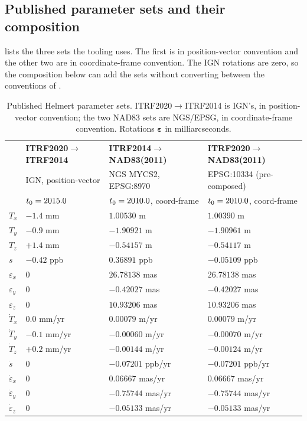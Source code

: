 \documentclass[main.tex]{subfiles}
\begin{document}
\subsection{Published parameter sets and their composition}\label{sec:trf-params}

 lists the three sets the tooling uses.  The first
is in position-vector convention and the other two are in
coordinate-frame convention.  The IGN rotations are zero, so the
composition below can add the sets without converting between the
conventions of .

\begin{table}[htbp]
\centering
\small
\caption{Published Helmert parameter sets.  ITRF2020$\to$ITRF2014 is
IGN's, in position-vector convention; the two NAD83 sets are NGS/EPSG,
in coordinate-frame convention.  Rotations $\bm{\varepsilon}$ in
milliarcseconds.}
\label{tab:trf-params}
\begin{tabular}{llll}
\toprule
& \textbf{ITRF2020$\to$ITRF2014} & \textbf{ITRF2014$\to$NAD83(2011)} & \textbf{ITRF2020$\to$NAD83(2011)} \\
& IGN, position-vector & NGS MYCS2, EPSG:8970 & EPSG:10334 (pre-composed) \\
& $t_0=2015.0$ & $t_0=2010.0$, coord-frame & $t_0=2010.0$, coord-frame \\
\midrule
$T_x$ & $-1.4$ mm            & $1.00530$ m      & $1.00390$ m \\
$T_y$ & $-0.9$ mm            & $-1.90921$ m     & $-1.90961$ m \\
$T_z$ & $+1.4$ mm            & $-0.54157$ m     & $-0.54117$ m \\
$s$   & $-0.42$ ppb          & $0.36891$ ppb    & $-0.05109$ ppb \\
$\varepsilon_x$ & $0$        & $26.78138$ mas   & $26.78138$ mas \\
$\varepsilon_y$ & $0$        & $-0.42027$ mas   & $-0.42027$ mas \\
$\varepsilon_z$ & $0$        & $10.93206$ mas   & $10.93206$ mas \\
\midrule
$\dot{T}_x$ & $0.0$ mm/yr    & $0.00079$ m/yr   & $0.00079$ m/yr \\
$\dot{T}_y$ & $-0.1$ mm/yr   & $-0.00060$ m/yr  & $-0.00070$ m/yr \\
$\dot{T}_z$ & $+0.2$ mm/yr   & $-0.00144$ m/yr  & $-0.00124$ m/yr \\
$\dot{s}$   & $0$            & $-0.07201$ ppb/yr& $-0.07201$ ppb/yr \\
$\dot{\varepsilon}_x$ & $0$  & $0.06667$ mas/yr & $0.06667$ mas/yr \\
$\dot{\varepsilon}_y$ & $0$  & $-0.75744$ mas/yr& $-0.75744$ mas/yr \\
$\dot{\varepsilon}_z$ & $0$  & $-0.05133$ mas/yr& $-0.05133$ mas/yr \\
\bottomrule
\end{tabular}
\end{table}
\end{document}

